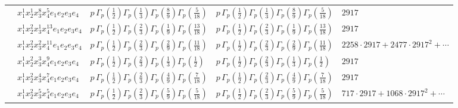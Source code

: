 \documentclass[11pt]{article}
\begin{document}
\begin{table}[ht]
{\begin{tabular}{@{}lllll@{}}
 & $x_{1}^{1} x_{2}^{1} x_{3}^{8} x_{4}^{5}  e_{1} e_{2} e_{3} e_{4}$ & $p \, \Gamma_p \left( \frac{1}{2} \right) \Gamma_p \left( \frac{1}{3} \right) \Gamma_p \left( \frac{8}{9} \right) \Gamma_p \left( \frac{5}{18} \right)$ & $p \, \Gamma_p \left( \frac{1}{2} \right) \Gamma_p \left( \frac{1}{3} \right) \Gamma_p \left( \frac{8}{9} \right) \Gamma_p \left( \frac{5}{18} \right)$ & $2917$ \\
 & $x_{1}^{1} x_{2}^{2} x_{3}^{1} x_{4}^{13}  e_{1} e_{2} e_{3} e_{4}$ & $p \, \Gamma_p \left( \frac{1}{2} \right) \Gamma_p \left( \frac{2}{3} \right) \Gamma_p \left( \frac{1}{9} \right) \Gamma_p \left( \frac{13}{18} \right)$ & $p \, \Gamma_p \left( \frac{1}{2} \right) \Gamma_p \left( \frac{2}{3} \right) \Gamma_p \left( \frac{1}{9} \right) \Gamma_p \left( \frac{13}{18} \right)$ & $2917$ \\
 & $x_{1}^{1} x_{2}^{2} x_{3}^{2} x_{4}^{11}  e_{1} e_{2} e_{3} e_{4}$ & $p \, \Gamma_p \left( \frac{1}{2} \right) \Gamma_p \left( \frac{2}{3} \right) \Gamma_p \left( \frac{2}{9} \right) \Gamma_p \left( \frac{11}{18} \right)$ & $p \, \Gamma_p \left( \frac{1}{2} \right) \Gamma_p \left( \frac{2}{3} \right) \Gamma_p \left( \frac{2}{9} \right) \Gamma_p \left( \frac{11}{18} \right)$ & $2258{\cdot}2917{+}2477{\cdot}2917^{2}{+}\cdots$ \\
 & $x_{1}^{1} x_{2}^{2} x_{3}^{3} x_{4}^{9}  e_{1} e_{2} e_{3} e_{4}$ & $p \, \Gamma_p \left( \frac{1}{2} \right) \Gamma_p \left( \frac{2}{3} \right) \Gamma_p \left( \frac{1}{3} \right) \Gamma_p \left( \frac{1}{2} \right)$ & $p \, \Gamma_p \left( \frac{1}{2} \right) \Gamma_p \left( \frac{2}{3} \right) \Gamma_p \left( \frac{1}{3} \right) \Gamma_p \left( \frac{1}{2} \right)$ & $2917$ \\
 & $x_{1}^{1} x_{2}^{2} x_{3}^{4} x_{4}^{7}  e_{1} e_{2} e_{3} e_{4}$ & $p \, \Gamma_p \left( \frac{1}{2} \right) \Gamma_p \left( \frac{2}{3} \right) \Gamma_p \left( \frac{4}{9} \right) \Gamma_p \left( \frac{7}{18} \right)$ & $p \, \Gamma_p \left( \frac{1}{2} \right) \Gamma_p \left( \frac{2}{3} \right) \Gamma_p \left( \frac{4}{9} \right) \Gamma_p \left( \frac{7}{18} \right)$ & $2917$ \\
 & $x_{1}^{1} x_{2}^{2} x_{3}^{5} x_{4}^{5}  e_{1} e_{2} e_{3} e_{4}$ & $p \, \Gamma_p \left( \frac{1}{2} \right) \Gamma_p \left( \frac{2}{3} \right) \Gamma_p \left( \frac{5}{9} \right) \Gamma_p \left( \frac{5}{18} \right)$ & $p \, \Gamma_p \left( \frac{1}{2} \right) \Gamma_p \left( \frac{2}{3} \right) \Gamma_p \left( \frac{5}{9} \right) \Gamma_p \left( \frac{5}{18} \right)$ & $717{\cdot}2917{+}1068{\cdot}2917^{2}{+}\cdots$ \\

\end{tabular}}
\end{table}
\end{document}

